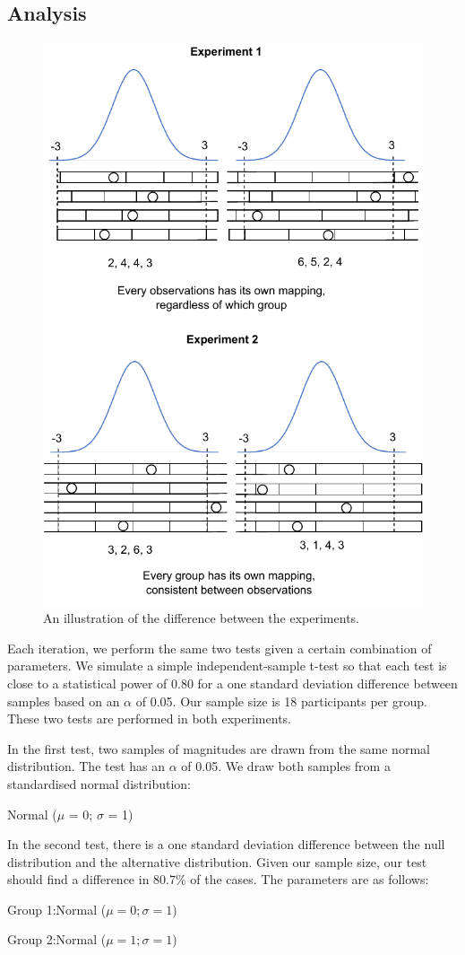 \documentclass[titlepage, a4paper, 11pt]{article}
\begin{document}
\subsection{Analysis}

\begin{figure}
    \centering
    \includegraphics[width=0.5\linewidth]{Plots/difference_between_experiments.pdf}
    \caption{An illustration of the difference between the experiments.}
    \label{fig:diagram_six}
\end{figure}

Each iteration, we perform the same two tests given a certain combination of parameters. We simulate a simple independent-sample t-test so that each test is close to a statistical power of 0.80 for a one standard deviation difference between samples based on an $\alpha$ of 0.05. Our sample size is 18 participants per group. These two tests are performed in both experiments.

In the first test, two samples of magnitudes are drawn from the same normal distribution. The test has an $\alpha$ of 0.05. We draw both samples from a standardised normal distribution:

    \centerline{Normal ($\mu$ = 0; $\sigma$ = 1)}

In the second test, there is a one standard deviation difference between the null distribution and the alternative distribution. Given our sample size, our test should find a difference in 80.7\% of the cases. The parameters are as follows:

    \centerline{Group 1:\@ Normal ($\mu = 0; \sigma = 1$)}
    \centerline{Group 2:\@ Normal ($\mu = 1; \sigma = 1$)}
\end{document}
